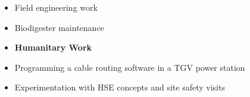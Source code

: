 \documentclass[10pt,a4paper,ragged2e,withhyper]{altacv}
\begin{document}
\begin{paracol}{2}
\divider

\begin{itemize}
\item \footnotesize Field engineering work
\item \footnotesize Biodigester maintenance
\item \small \textbf{Humanitary Work}
\end{itemize}

\divider

\begin{itemize}
\item \footnotesize Programming a cable routing software in a TGV power station
\item \footnotesize Experimentation with HSE concepts and site safety visits
\end{itemize}












\end{paracol}
\end{document}

